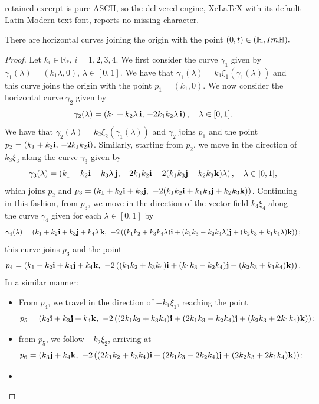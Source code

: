 \documentclass[10pt,a4paper]{amsart}
\newcommand{\R}{\mathbb{R}}
\newcommand{\bi}{{\bf i}}
\newcommand{\bj}{{\bf j}}
\newcommand{\bk}{{\bf k}}
\newcommand{\mH}{\mathbb{H}}
\renewcommand{\Im}{\textrm{Im}}
\begin{document}
retained excerpt is pure ASCII, so the delivered engine, XeLaTeX with its default Latin Modern text font, reports no missing character.
\begin{lem}\label{lem:ver}
There are horizontal curves joining the origin with the point $(0, t)\in(\mH, {\emph\Im}\mH).$
\end{lem}

\begin{proof}
Let $ k_i \in \R_*$,  $i = 1, 2, 3, 4$. 
We first consider the curve $\gamma_1$ given by $\gamma_1(\lambda)=(k_1\lambda,0)$, $\lambda\in[0,1]$. We have that $\dot\gamma_1(\lambda)=k_1\xi_1(\gamma_1(\lambda))$ and this curve joins the origin with the point $p_1=(k_1,0)$. We now consider the horizontal curve $\gamma_2$ given by
$$
\gamma_2(\lambda) = \left(k_1 + k_2 \lambda\, \bi,\, -2k_1 k_2 \lambda \,\bi \right), \quad \lambda\in[0,1].
$$
We have that $\dot\gamma_2(\lambda)=k_2\xi_2(\gamma_1(\lambda))$ and $\gamma_2$ joins $p_1$ and the point $ p_2 = \left(k_1 + k_2 \bi,\, -2k_1 k_2 \bi\right) $. 
Similarly, starting from $p_2$, we move in the direction of $k_3\xi_3$ along the curve $\gamma_3$ given by 
$$
\gamma_3(\lambda) = \left(k_1 + k_2 \bi + k_3 \lambda\, \bj,\, -2k_1 k_2 \bi - 2(k_1 k_3 \bj + k_2 k_3 \bk)\lambda \right), \quad \lambda\in[0,1],
$$
which joins $p_2$ and $ p_3 = \left(k_1 + k_2 \bi + k_3 \bj,\ -2(k_1 k_2 \bi + k_1 k_3 \bj + k_2 k_3 \bk)\right) $. Continuing in this fashion, from $p_3$, we move in the direction of the vector field $k_4 \xi_4$ along the curve   $\gamma_4$ given for each $\lambda\in[0,1]$ by
$$
\gamma_4(\lambda) = \left(k_1 + k_2 \bi + k_3 \bj + k_4 \lambda\, \bk,\ -2\left((k_1 k_2 + k_3 k_4 \lambda) \bi + (k_1 k_3 - k_2 k_4 \lambda) \bj + (k_2 k_3 + k_1 k_4 \lambda) \bk\right) \right);
$$ 
this curve joins $p_3$ and the point  
$$
p_4 = \left(k_1 + k_2 \bi + k_3 \bj + k_4 \bk,\ -2\left((k_1 k_2 + k_3 k_4) \bi + (k_1 k_3 - k_2 k_4) \bj + (k_2 k_3 + k_1 k_4) \bk\right) \right).
$$
In a similar manner:
\begin{itemize}
\item
From $p_4$, we travel in the direction of $ -k_1 \xi_1 $, reaching the point  
$$
p_5 = \left(k_2 \bi + k_3 \bj + k_4 \bk,\ -2\left((2k_1 k_2 + k_3 k_4) \bi + (2k_1 k_3 - k_2 k_4) \bj + (k_2 k_3 + 2k_1 k_4) \bk\right) \right);
$$
\item from $p_5$, we follow $-k_2 \xi_2 $, arriving at  
$$
p_6 = \left(k_3 \bj + k_4 \bk,\ -2\left((2k_1 k_2 + k_3 k_4) \bi + (2k_1 k_3 - 2k_2 k_4) \bj + (2k_2 k_3 + 2k_1 k_4) \bk\right) \right);
$$
\item

\end{itemize}
\end{proof}
\end{document}
